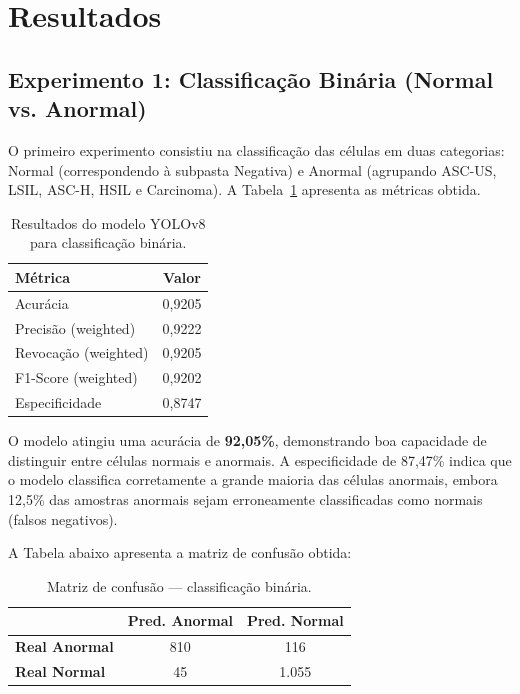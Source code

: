 \documentclass[12pt, a4paper]{article}
\begin{document}
\section{Resultados} \label{sec:resultados}

\subsection{Experimento 1: Classificação Binária (Normal vs. Anormal)}

O primeiro experimento consistiu na classificação das células em duas categorias: Normal (correspondendo à subpasta Negativa) e Anormal (agrupando ASC-US, LSIL, ASC-H, HSIL e Carcinoma). A Tabela~\ref{tab:res_binario} apresenta as métricas obtida.

\begin{table}[H]
\centering
\caption{Resultados do modelo YOLOv8 para classificação binária.}
\label{tab:res_binario}
\begin{tabular}{lc}
\toprule
\textbf{Métrica} & \textbf{Valor} \\
\midrule
Acurácia              & 0,9205 \\
Precisão (weighted)   & 0,9222 \\
Revocação (weighted)  & 0,9205 \\
F1-Score (weighted)   & 0,9202 \\
Especificidade        & 0,8747 \\
\bottomrule
\end{tabular}
\end{table}

O modelo atingiu uma acurácia de \textbf{92,05\%}, demonstrando boa capacidade de distinguir entre células normais e anormais. A especificidade de 87,47\% indica que o modelo classifica corretamente a grande maioria das células anormais, embora 12,5\% das amostras anormais sejam erroneamente classificadas como normais (falsos negativos).

A Tabela abaixo apresenta a matriz de confusão obtida:

\begin{table}[H]
\centering
\caption{Matriz de confusão --- classificação binária.}
\label{tab:cm_binario}
\begin{tabular}{lcc}
\toprule
 & \textbf{Pred. Anormal} & \textbf{Pred. Normal} \\
\midrule
\textbf{Real Anormal} & 810  & 116 \\
\textbf{Real Normal}  & 45   & 1.055 \\
\bottomrule
\end{tabular}
\end{table}
\end{document}
